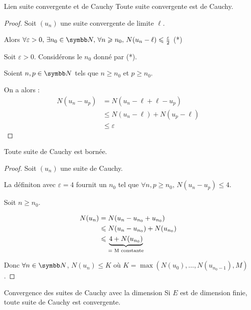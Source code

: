\begin{proposition}{Lien suite convergente et de Cauchy}{}
    Toute suite convergente est de Cauchy.
\end{proposition}

\begin{proof}
    Soit $(u_n)$ une suite convergente de limite $\ell$.

    Alors $\forall \varepsilon > 0, \, \exists n_0 \in \N, \, \forall n \geqslant n_0, \, N(u_n - \ell) \leqslant \frac \varepsilon 2$ (*)

    Soit $\varepsilon > 0$. 
    Considérons le $n_0$ donné par (*). 

    Soient $n, p \in \N$ tels que $n \geqslant n_0$ et $p \geqslant n_0$.

    On a alors : 
    \begin{align*}
        N(u_n - u_p) & = N(u_n - \ell + \ell - u_p) \\
        & \leqslant N(u_n - \ell) + N(u_p - \ell) \\
        & \leqslant \varepsilon
    \end{align*}
\end{proof}

\begin{proposition}{}{}
    Toute suite de Cauchy est bornée. 
\end{proposition}

\begin{proof}
    Soit $(u_n)$ une suite de Cauchy.

    La définiton avec $\varepsilon = 4$ fournit un $n_0$ tel que $\forall n, p \geqslant n_0, \, N(u_n - u_p) \leqslant 4$.

    Soit $n \geqslant n_0$. 

    \begin{align*}
        N(u_n) & = N(u_n - u_{n_0} + u_{n_0}) \\
        & \leqslant N(u_n - u_{n_0}) + N(u_{n_0}) \\
        & \leqslant  \underbrace{4 + N(u_{n_0})}_{\text{= M \text{constante}}}
    \end{align*}

    Donc $\forall n \in \N$, $N(u_n) \leqslant K$ où $K = \max( N(u_0), \ldots, N(u_{n_0 - 1}), M)$.
\end{proof}

\begin{theoreme}{Convergence des suites de Cauchy avec la dimension}{}
    Si $E$ est de dimension finie, toute suite de Cauchy est convergente. 
\end{theoreme}

